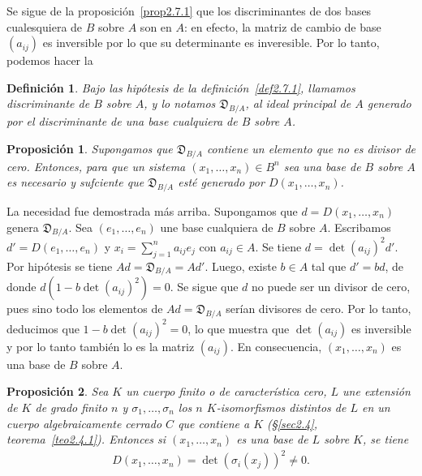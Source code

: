 \documentclass[bibtotoc,leqno,spanish]{amsbook}
\let\emph\relax %
\newcommand{\disc}{\mathfrak{D}}
\numberwithin{equation}{section}
\theoremstyle{note}
\newtheorem{definition}{Definici\'on}
\theoremstyle{note}
\newtheorem{proposition}{Proposici\'on}
\theoremstyle{rem}
\numberwithin{theorem}{section}
\numberwithin{proposition}{section}
\numberwithin{definition}{section}
\numberwithin{lemma}{section}
\numberwithin{corollary}{section}
\numberwithin{example}{section}
\numberwithin{footnote}{section}%
\begin{document}
Se sigue de la proposici\'on~\ref{prop2.7.1} que los discriminantes de dos bases cualesquiera de $B$ sobre $A$ son \emph{asociados}
en $A$: en efecto, la matriz de cambio de base $(a_{ij})$ es inversible por lo que su determinante es inveresible.
Por lo tanto, podemos hacer la

\begin{definition}\label{def2.7.2}
Bajo las hip\'otesis de la definici\'on~\ref{def2.7.1}, llamamos discriminante de $B$ sobre $A$, y lo notamos $\disc_{B/A}$,
al ideal principal de $A$ generado por el discriminante de una base cualquiera de $B$ sobre $A$.
\end{definition}

\begin{proposition}
Supongamos que $\disc_{B/A}$ contiene un elemento que no es divisor de cero. Entonces, para que un sistema
$(x_{1},\dots,x_{n})\in B^{n}$ sea una base de $B$ sobre $A$ es necesario y sufciente que $\disc_{B/A}$ est\'e
generado por $D(x_{1},\dots,x_{n})$.
\end{proposition}

La necesidad fue demostrada m\'as arriba. Supongamos que $d = D(x_{1},\dots,x_{n})$ genera
$\disc_{B/A}$. Sea $(e_{1},\dots,e_{n})$ une base cualquiera de $B$ sobre $A$.
Escribamos $d' = D(e_{1},\dots,e_{n})$ y $x_{i} = \sum_{j=1}^{n}a_{ij}e_{j}$ con $a_{ij}\in A$. Se tiene
$d = \det(a_{ij})^{2}d'$. Por hip\'otesis se tiene $Ad = \disc_{B/A} = Ad'$. Luego, existe $b\in A$ tal que
$d' = bd$, de donde $d(1-b\det(a_{ij})^{2}) = 0$. Se sigue que $d$ no puede ser un divisor de cero, pues sino
todo los elementos de $Ad = \disc_{B/A}$ ser\'ian divisores de cero. Por lo tanto, deducimos que
$1-b\det(a_{ij})^{2} = 0$, lo que muestra que $\det(a_{ij})$ es inversible y por lo tanto tambi\'en lo es
la matriz $(a_{ij})$. En consecuencia, $(x_{1},\dots,x_{n})$ es una base de $B$ sobre $A$.

\begin{proposition}\label{prop2.7.3}
Sea $K$ un cuerpo finito o de caracter\'istica cero, $L$ une extensi\'on de $K$ de grado finito $n$ y
$\sigma_{1},\dots,\sigma_{n}$ los $n$ $K$-isomorfismos distintos de $L$ en un cuerpo algebraicamente cerrado
$C$ que contiene a $K$ (\S\ref{sec2.4}, teorema~\ref{teo2.4.1}). Entonces si $(x_{1},\dots,x_{n})$ es una base de $L$ sobre $K$, se tiene
\begin{gather}
D(x_{1},\dots,x_{n}) = \det(\sigma_{i}(x_{j}))^{2}\neq 0.
\end{gather}
\end{proposition}
\end{document}
